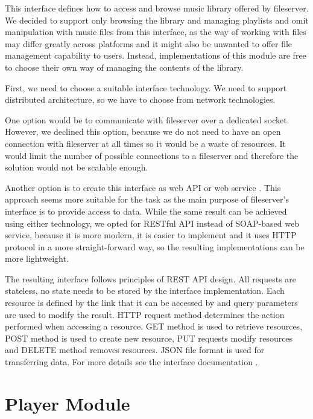 This interface defines how to access and browse music library offered by fileserver. We decided to support only browsing the library and managing playlists and omit manipulation with music files from this interface, as the way of working with files may differ greatly across platforms and it might also be unwanted to offer file management capability to users. Instead, implementations of this module are free to choose their own way of managing the contents of the library.
\par
First, we need to choose a suitable interface technology. We need to support distributed architecture, so we have to choose from network technologies.
\par
One option would be to communicate with fileserver over a dedicated socket. However, we declined this option, because we do not need to have an open connection with fileserver at all times so it would be a waste of resources. It would limit the number of possible connections to a fileserver and therefore the solution would not be scalable enough.
\par
Another option is to create this interface as web API or web service . This approach seems more suitable for the task as the main purpose of fileserver's interface is to provide access to data. While the same result can be achieved using either technology, we opted for RESTful API instead of SOAP-based web service, because it is more modern, it is easier to implement and it uses HTTP protocol in a more straight-forward way, so the resulting implementations can be more lightweight.
\par
The resulting interface follows principles of REST API design. All requests are stateless, no state needs to be stored by the interface implementation. Each resource is defined by the link that it can be accessed by and query parameters are used to modify the result. HTTP request method determines the action performed when accessing a resource. GET method is used to retrieve resources, POST method is used to create new resource, PUT requests modify resources and DELETE method removes resources. JSON file format is used for transferring data. For more details see the interface documentation .

\section {Player Module}

